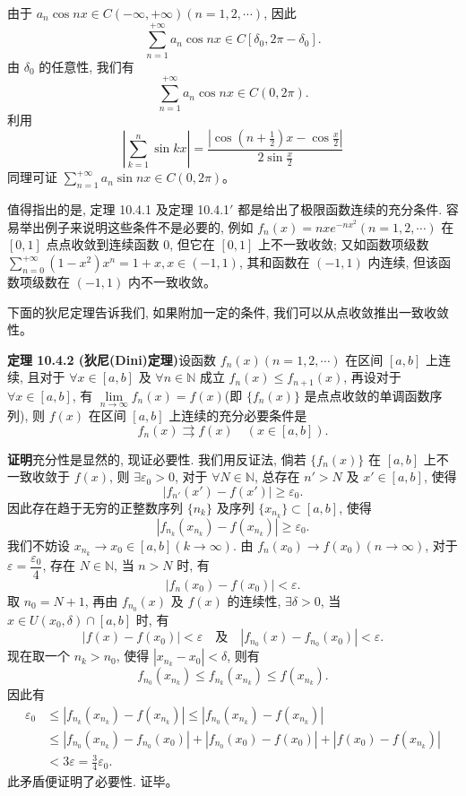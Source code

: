 \documentclass[UTF8,12pt,a4paper,fontset=fandol]{ctexart}
\begin{document}
由于 $a_n\cos nx\in C(-\infty,+\infty)(n=1,2,\cdots)$, 因此
\[
  \sum_{n=1}^{+\infty}a_n\cos nx\in C[\delta_0,2\pi-\delta_0].
\]
由 $\delta_0$ 的任意性, 我们有
\[
  \sum_{n=1}^{+\infty}a_n\cos nx\in C(0,2\pi).
\]
利用
\[
  \left|\sum_{k=1}^n\sin kx\right|
  =\frac{\left|\cos\left(n+\frac12\right)x-\cos\frac{x}{2}\right|}{2\sin\frac{x}{2}}
\]
同理可证 $\sum\limits_{n=1}^{+\infty}a_n\sin nx\in C(0,2\pi)$。

值得指出的是, 定理 10.4.1 及定理 10.4.1$'$ 都是给出了极限函数连续的充分条件. 容易举出例子来说明这些条件不是必要的, 例如 $f_n(x)=nxe^{-nx^2}(n=1,2,\cdots)$ 在 $[0,1]$ 点点收敛到连续函数 $0$, 但它在 $[0,1]$ 上不一致收敛; 又如函数项级数 $\sum\limits_{n=0}^{+\infty}(1-x^2)x^n=1+x, x\in(-1,1)$, 其和函数在 $(-1,1)$ 内连续, 但该函数项级数在 $(-1,1)$ 内不一致收敛。

下面的狄尼定理告诉我们, 如果附加一定的条件, 我们可以从点收敛推出一致收敛性。

\noindent\textbf{定理 10.4.2 (狄尼(Dini)定理)}\quad 设函数 $f_n(x)(n=1,2,\cdots)$ 在区间 $[a,b]$ 上连续, 且对于 $\forall x\in[a,b]$ 及 $\forall n\in\mathbb N$ 成立 $f_n(x)\leq f_{n+1}(x)$, 再设对于 $\forall x\in[a,b]$, 有 $\lim\limits_{n\to\infty}f_n(x)=f(x)$(即 $\{f_n(x)\}$ 是点点收敛的单调函数序列), 则 $f(x)$ 在区间 $[a,b]$ 上连续的充分必要条件是
\[
  f_n(x)\rightrightarrows f(x)\quad(x\in[a,b]).
\]

\noindent\textbf{证明}\quad 充分性是显然的, 现证必要性. 我们用反证法, 倘若 $\{f_n(x)\}$ 在 $[a,b]$ 上不一致收敛于 $f(x)$, 则 $\exists\varepsilon_0>0$, 对于 $\forall N\in\mathbb N$, 总存在 $n'>N$ 及 $x'\in[a,b]$, 使得
\[
  |f_{n'}(x')-f(x')|\geq\varepsilon_0.
\]
因此存在趋于无穷的正整数序列 $\{n_k\}$ 及序列 $\{x_{n_k}\}\subset[a,b]$, 使得
\[
  |f_{n_k}(x_{n_k})-f(x_{n_k})|\geq\varepsilon_0.
\]
我们不妨设 $x_{n_k}\to x_0\in[a,b](k\to\infty)$. 由 $f_n(x_0)\to f(x_0)(n\to\infty)$, 对于 $\varepsilon=\dfrac{\varepsilon_0}{4}$, 存在 $N\in\mathbb N$, 当 $n>N$ 时, 有
\[
  |f_n(x_0)-f(x_0)|<\varepsilon.
\]
取 $n_0=N+1$, 再由 $f_{n_0}(x)$ 及 $f(x)$ 的连续性, $\exists\delta>0$, 当 $x\in U(x_0,\delta)\cap[a,b]$ 时, 有
\[
  |f(x)-f(x_0)|<\varepsilon\quad\text{及}\quad |f_{n_0}(x)-f_{n_0}(x_0)|<\varepsilon.
\]
现在取一个 $n_k>n_0$, 使得 $|x_{n_k}-x_0|<\delta$, 则有
\[
  f_{n_0}(x_{n_k})\leq f_{n_k}(x_{n_k})\leq f(x_{n_k}).
\]
因此有
\[
\begin{aligned}
  \varepsilon_0
  &\leq |f_{n_k}(x_{n_k})-f(x_{n_k})|
  \leq |f_{n_0}(x_{n_k})-f(x_{n_k})|\\
  &\leq |f_{n_0}(x_{n_k})-f_{n_0}(x_0)|+|f_{n_0}(x_0)-f(x_0)|+|f(x_0)-f(x_{n_k})|\\
  &<3\varepsilon=\frac34\varepsilon_0.
\end{aligned}
\]
此矛盾便证明了必要性. 证毕。
\end{document}
